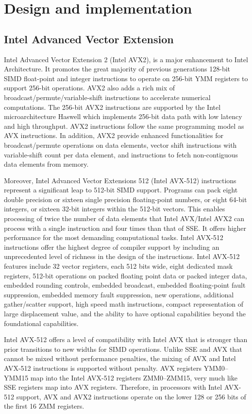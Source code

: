 \documentclass[sigconf,review]{acmart}
\begin{document}
\section{Design and implementation}\label{sec:design}
\subsection{Intel Advanced Vector Extension}
Intel Advanced Vector Extension 2 (Intel AVX2), is a major enhancement to Intel Architecture.
It promotes the great majority of previous generations 128-bit SIMD float-point and integer instructions
to operate on 256-bit YMM registers to support 256-bit operations.
AVX2 also adds a rich mix of broadcast/permute/variable-shift instructions to accelerate
numerical computations. The 256-bit AVX2 instructions are supported by the Intel microarchitecture
Haswell which implements 256-bit data path with low latency and high throughput.
AVX2 instructions follow the same programming model as AVX instructions.
In addition, AVX2 provide enhanced functionalities for broadcast/permute operations on data elements,
vector shift instructions with variable-shift count per data element,
and instructions to fetch non-contiguous data elements from memory.

Moreover, Intel Advanced Vector Extensions 512 (Intel AVX-512) instructions
represent a significant leap to 512-bit SIMD support.
Programs can pack eight double precision or sixteen single precision floating-point numbers,
or eight 64-bit integers, or sixteen 32-bit integers within the 512-bit vectors.
This enables processing of twice the number of data elements that Intel AVX/Intel AVX2 can
process with a single instruction and four times than that of SSE.
It offers higher performance for the most demanding computational tasks.
Intel AVX-512 instructions offer the highest degree of compiler support by including an
unprecedented level of richness in the design of the instructions.
Intel AVX-512 features include 32 vector registers, each 512 bits wide, eight dedicated mask registers,
512-bit operations on packed floating point data or packed integer data, embedded rounding controls,
embedded broadcast, embedded floating-point fault suppression, embedded memory fault suppression, new operations,
additional gather/scatter support, high speed math instructions, compact representation of
large displacement value, and the ability to have optional capabilities beyond the foundational
capabilities.

Intel AVX-512 offers a level of compatibility with Intel AVX that is stronger than
prior transitions to new widths for SIMD operations. Unlike SSE and AVX that cannot
be mixed without performance penalties, the mixing of AVX and Intel AVX-512 instructions
is supported without penalty. AVX registers YMM0–YMM15 map into the Intel AVX-512 registers
ZMM0–ZMM15, very much like SSE registers map into AVX registers. Therefore, in processors with
Intel AVX-512 support, AVX and AVX2 instructions operate on the lower 128 or 256 bits of the first 16 ZMM registers.
\end{document}
